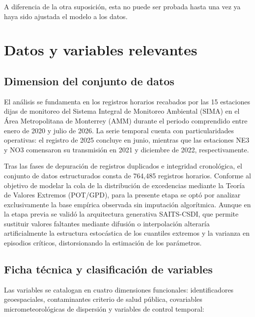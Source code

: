 \documentclass[11pt]{article}
\begin{document}
A diferencia de la otra suposición, esta no puede ser probada hasta una vez ya haya sido ajustada el modelo a los datos.

\section{Datos y variables relevantes}

\subsection{Dimension del conjunto de datos}

El análisis se fundamenta en los registros horarios recabados por las 15 estaciones dijas de monitoreo del Sistema Integral de Monitoreo Ambiental (SIMA) en el Área Metropolitana de Monterrey (AMM) durante el periodo comprendido entre enero de 2020 y julio de 2026. La serie temporal cuenta con particularidades operativas: el registro de 2025 concluye en junio, mientras que las estaciones NE3 y NO3 comensaron su transmisión en 2021 y diciembre de 2022, respectivamente. 

Tras las fases de depuración de registros duplicados e integridad cronológica, el conjunto de datos estructurados consta de 764,485 registros horarios. Conforme al objetivo de modelar la cola de la distribución de excedencias mediante la Teoría de Valores Extremos (POT/GPD), para la presente etapa se optó por analizar exclusivamente la base empírica observada sin imputación algorítmica. Aunque en la etapa previa se validó la arquitectura generativa SAITS-CSDI, que permite sustituir valores faltantes mediante difusión o interpolación alteraría artificialmente la estructura estocástica de los cuantiles extremos y la varianza en episodios críticos, distorsionando la estimación de los parámetros. 

\subsection{Ficha técnica y clasificación de variables}

Las variables se catalogan en cuatro dimensiones funcionales: identificadores geoespaciales, contaminantes criterio de salud pública, covariables micrometeorológicas de dispersión y variables de control temporal:
\end{document}
